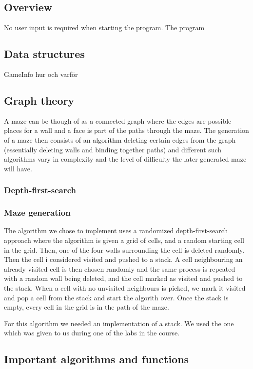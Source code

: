 \documentclass[12pt, a4paper]{article}
\begin{document}
\subsection{Overview}
No user input is required when starting the program. The program 


\subsection{Data structures}
GameInfo hur och varför


\subsection{Graph theory}
A maze can be though of as a connected graph where the edges are possible places for a wall and a face is part of the paths through the maze. The generation of a maze then consists of an algorithm deleting certain edges from the graph (essentially deleting walls and binding together paths) and different such algorithms vary in complexity and the level of difficulty the later generated maze will have. 


\subsubsection{Depth-first-search}


\subsubsection{Maze generation}
The algorithm we chose to implement uses a randomized depth-first-search approach where the algorithm is given a grid of cells, and a random starting cell in the grid. Then, one of the four walls surrounding the cell is deleted randomly. Then the cell i considered visited and pushed to a stack. A cell neighbouring an already visited cell is then chosen randomly and the same process is repeated with a random wall being deleted, and the cell marked as visited and pushed to the stack. When a cell with no unvisited neighbours is picked, we mark it visited and pop a cell from the stack and start the algorith over. Once the stack is empty, every cell in the grid is in the path of the maze. 

For this algorithm we needed an implementation of a stack. We used the one which was given to us during one of the labs in the course. 



\subsection{Important algorithms and functions}
\end{document}
